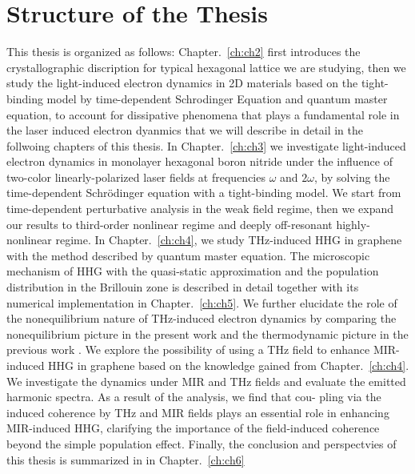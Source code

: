 \section{Structure of the Thesis}
This thesis is organized as follows: Chapter.~\ref{ch:ch2} first introduces the crystallographic discription
for typical hexagonal lattice we are studying, then we study the light-induced electron dynamics in 2D materials based on the tight-binding model by
time-dependent Schrodinger Equation and quantum master equation, to account for dissipative phenomena that plays a fundamental role in the laser induced electron dyanmics that we will describe in detail in the follwoing chapters of this thesis.
In Chapter.~\ref{ch:ch3} we investigate light-induced electron dynamics in monolayer hexagonal
boron nitride under the influence of two-color linearly-polarized laser fields at frequencies
$\omega$ and $2\omega$, by solving the time-dependent Schr\"odinger equation with a tight-binding
model. We start from time-dependent perturbative analysis in the weak field regime, then we expand
our results to third-order nonlinear regime and deeply off-resonant highly-nonlinear regime.
In Chapter.~\ref{ch:ch4}, we study THz-induced HHG in graphene with the method described by quantum
master equation. The microscopic mechanism of
HHG with the quasi-static approximation and the population distribution in the Brillouin zone is
described in detail together with its numerical implementation in Chapter.~\ref{ch:ch5}. We further elucidate the role of the nonequilibrium nature of THz-induced electron dynamics by comparing the nonequilibrium picture in the present work and the thermodynamic picture in the previous work \cite{mics2015thermodynamic}.
We explore the possibility of using a THz
field to enhance MIR-induced HHG in graphene based
on the knowledge gained from Chapter.~\ref{ch:ch4}. We investigate the dynamics under MIR and THz fields and evaluate the emitted harmonic spectra. As a result of the analysis, we find that cou- pling via the induced coherence by THz and MIR fields plays an essential role in enhancing MIR-induced HHG, clarifying the importance of the field-induced coherence beyond the simple population effect.
Finally, the conclusion and perspectvies of this thesis is summarized in in Chapter.~\ref{ch:ch6}
